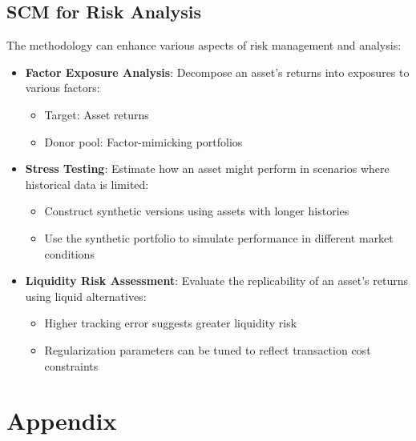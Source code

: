 \subsection{SCM for Risk Analysis}
The methodology can enhance various aspects of risk management and analysis:

\begin{itemize}
    \item \textbf{Factor Exposure Analysis}: Decompose an asset's returns into exposures to various factors:
    \begin{itemize}
        \item Target: Asset returns
        \item Donor pool: Factor-mimicking portfolios
    \end{itemize}
    
    \item \textbf{Stress Testing}: Estimate how an asset might perform in scenarios where historical data is limited:
    \begin{itemize}
        \item Construct synthetic versions using assets with longer histories
        \item Use the synthetic portfolio to simulate performance in different market conditions
    \end{itemize}
    
    \item \textbf{Liquidity Risk Assessment}: Evaluate the replicability of an asset's returns using liquid alternatives:
    \begin{itemize}
        \item Higher tracking error suggests greater liquidity risk
        \item Regularization parameters can be tuned to reflect transaction cost constraints
    \end{itemize}
\end{itemize}


\newpage 
\section{Appendix}


